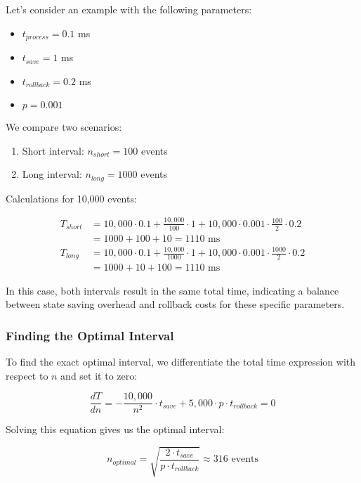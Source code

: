 Let's consider an example with the following parameters:

\begin{itemize}
    \item $t_{process} = 0.1$ ms
    \item $t_{save} = 1$ ms
    \item $t_{rollback} = 0.2$ ms
    \item $p = 0.001$
\end{itemize}

We compare two scenarios:

\begin{enumerate}
    \item Short interval: $n_{short} = 100$ events
    \item Long interval: $n_{long} = 1000$ events
\end{enumerate}

Calculations for 10,000 events:

\begin{align*}
    T_{short} &= 10,000 \cdot 0.1 + \frac{10,000}{100} \cdot 1 + 10,000 \cdot 0.001 \cdot \frac{100}{2} \cdot 0.2 \\
              &= 1000 + 100 + 10 = 1110 \text{ ms} \\[10pt]
    T_{long}  &= 10,000 \cdot 0.1 + \frac{10,000}{1000} \cdot 1 + 10,000 \cdot 0.001 \cdot \frac{1000}{2} \cdot 0.2 \\
              &= 1000 + 10 + 100 = 1110 \text{ ms}
\end{align*}

In this case, both intervals result in the same total time, indicating a balance between state saving overhead and rollback costs for these specific parameters.

\subsubsection{Finding the Optimal Interval}

To find the exact optimal interval, we differentiate the total time expression with respect to $n$ and set it to zero:

\begin{equation}
    \frac{dT}{dn} = -\frac{10,000}{n^2} \cdot t_{save} + 5,000 \cdot p \cdot t_{rollback} = 0
\end{equation}

Solving this equation gives us the optimal interval:

\begin{equation}
    n_{optimal} = \sqrt{\frac{2 \cdot t_{save}}{p \cdot t_{rollback}}} \approx 316 \text{ events}
\end{equation}

